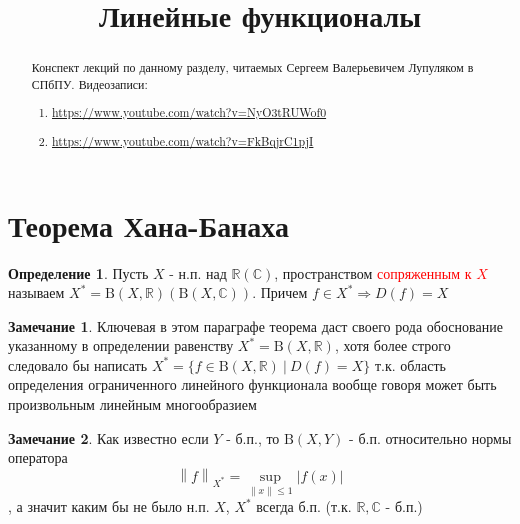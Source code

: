 \documentclass[12pt,a4paper]{article}
\title{Линейные функционалы}
\date{}
\theoremstyle{definition}
\newtheorem{definition}{Определение}[section]
\newtheorem{corollarydf}{Замечание}[definition]
\newcommand{\Real}{\mathbb{R}}
\newcommand{\Cmplx}{\mathbb{C}}
\newcommand{\norm}[1]{\left\lVert#1\right\rVert}
\newcommand{\setbuild}[2]{\{#1\:|\:#2\}}
\newcommand{\bounded}[2]{\textrm{B}(#1, #2)}
\begin{document}
\maketitle

\begin{abstract}
	Конспект лекций по данному разделу, читаемых Сергеем Валерьевичем Лупуляком в СПбПУ. Видеозаписи:
	\begin{enumerate}
		\item \url{https://www.youtube.com/watch?v=NyO3tRUWof0}
		\item \url{https://www.youtube.com/watch?v=FkBqjrC1pjI}
	\end{enumerate}
	
\end{abstract}

\newpage

\section{Теорема Хана-Банаха}

\begin{definition}
	Пусть $X$ - н.п. над $\Real(\Cmplx)$, пространством \textcolor{red}{сопряженным к $X$} называем $X^*=\bounded{X}{\Real}(\bounded{X}{\Cmplx})$. Причем $f\in X^*\Rightarrow D(f)=X$
\end{definition}
\begin{corollarydf}
	Ключевая в этом параграфе теорема даст своего рода обоснование указанному в определении равенству $X^*=\bounded{X}{\Real}$, хотя более строго следовало бы написать $X^*=\setbuild{f\in \bounded{X}{\Real}}{D(f)=X}$ т.к. область определения ограниченного линейного функционала вообще говоря может быть произвольным линейным многообразием
\end{corollarydf}
\begin{corollarydf}
	Как известно если $Y$ - б.п., то $\bounded{X}{Y}$ - б.п. относительно нормы оператора $$\norm{f}_{X^*}=\sup_{\norm{x}\leq1}|f(x)|$$, а значит каким бы не было н.п. $X$, $X^*$ всегда б.п. (т.к. $\Real,\Cmplx$ - б.п.)
\end{corollarydf}
\end{document}
